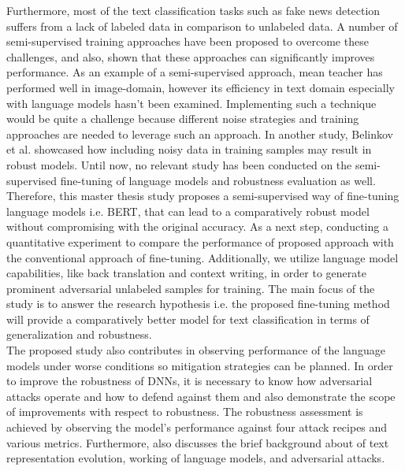 \documentclass[%
	BCOR=8mm, %
	DIV=12,
	toc=bibliography, %
	toc=listof, %
	oneside, %
	egregdoesnotlikesansseriftitles, %
	]{scrbook}
\begin{document}
Furthermore, most of the text classification tasks such as fake news detection suffers from a lack of labeled data in comparison to unlabeled data. A number of semi-supervised training approaches have been proposed to overcome these challenges, and  also, shown that these approaches can significantly improves performance.  As an example of a semi-supervised approach, mean teacher \cite{tarvainen_mean_2018}  has performed well in image-domain, however its efficiency in text domain especially with language models hasn't been examined. Implementing such a technique would be quite a challenge because different noise strategies and training approaches are needed to leverage such an approach. In another study, Belinkov et al. \cite{belinkov_synthetic_2018} showcased how including noisy data in training samples may result in robust models. Until now, no relevant study has been conducted on the  semi-supervised fine-tuning of language models and robustness evaluation as well. \\
Therefore, this master thesis study proposes a semi-supervised way of fine-tuning language models i.e. BERT, that can lead to a comparatively robust model without compromising with the original accuracy. As a next step, conducting a quantitative experiment to compare the performance of proposed approach with the conventional approach of fine-tuning. Additionally, we utilize language model capabilities, like back translation and context writing, in order to generate prominent adversarial unlabeled samples for training. The main focus of the study is to answer the research hypothesis i.e. the proposed fine-tuning method will provide a comparatively better model for text classification in terms of generalization and robustness.\\
The proposed study also contributes in observing performance of the language models under worse conditions so mitigation strategies can be planned. In order to improve the robustness of DNNs, it is necessary to know how adversarial attacks operate and how to defend against them and also demonstrate the scope of improvements with respect to robustness. The robustness assessment is achieved by observing the model's performance against four attack recipes and various metrics. Furthermore, also discusses the brief background about of text representation evolution, working of language models, and adversarial attacks. 
\end{document}
